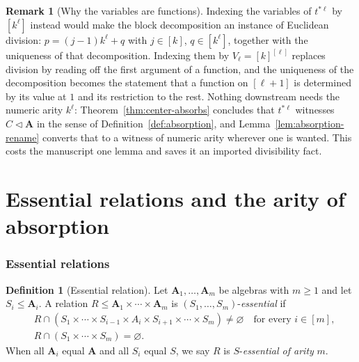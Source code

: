 \documentclass[11pt]{article}
\theoremstyle{mainplain}
\theoremstyle{mainroman}
\theoremstyle{definition}
\newtheorem{definition}[theorem]{Definition}
\newtheorem{remark}[theorem]{Remark}
\numberwithin{equation}{section}
\newcommand{\bA}{\mathbf A}
\newcommand{\ab}{\lhd}
\begin{document}
\begin{remark}[Why the variables are functions]\label{rem:star-indexing}
Indexing the variables of $t^{*\ell}$ by $[k^{\ell}]$ instead would make the
block decomposition an instance of Euclidean division: $p=(j-1)k^{\ell}+q$ with
$j\in[k]$, $q\in[k^{\ell}]$, together with the uniqueness of that
decomposition. Indexing them by $V_{\ell}=[k]^{[\ell]}$ replaces division by
reading off the first argument of a function, and the uniqueness of the
decomposition becomes the statement that a function on $[\ell+1]$ is determined
by its value at $1$ and its restriction to the rest. Nothing downstream needs
the numeric arity $k^{\ell}$: Theorem~\ref{thm:center-absorbs} concludes that
$t^{*\ell}$ witnesses $C\ab\bA$ in the sense of
Definition~\ref{def:absorption}, and Lemma~\ref{lem:absorption-rename} converts
that to a witness of numeric arity wherever one is wanted. This costs the
manuscript one lemma and saves it an imported divisibility fact.
\end{remark}

\part{Essential relations and the arity of absorption}
\label{part:essential}

\section{Essential relations}\label{sec:essential}

\begin{definition}[Essential relation]\label{def:essential}
Let $\bA_1,\dots,\bA_m$ be algebras with $m\ge1$ and let $S_i\le\bA_i$. A
relation $R\le\bA_1\times\cdots\times\bA_m$ is
$(S_1,\dots,S_m)$-\emph{essential} if
\begin{align}
 &R\cap(S_1\times\cdots\times S_{i-1}\times A_i\times S_{i+1}\times\cdots\times S_m)\ne\varnothing
 \quad\text{for every }i\in[m],\label{eq:E1}\\
 &R\cap(S_1\times\cdots\times S_m)=\varnothing.\label{eq:E2}
\end{align}
When all $\bA_i$ equal $\bA$ and all $S_i$ equal $S$, we say $R$ is
$S$-\emph{essential of arity} $m$.
\end{definition}
\end{document}
